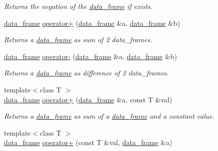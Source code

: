 \begin{DoxyCompactItemize}
\begin{DoxyCompactList}\small\item\em Returns the negation of the \hyperlink{classboost_1_1numeric_1_1ublas_1_1data__frame}{data\+\_\+frame} if exists. \end{DoxyCompactList}\item 
\hyperlink{classboost_1_1numeric_1_1ublas_1_1data__frame}{data\+\_\+frame} \hyperlink{namespaceboost_1_1numeric_1_1ublas_aef3513791390396555e7784ec06119b1}{operator+} (\hyperlink{classboost_1_1numeric_1_1ublas_1_1data__frame}{data\+\_\+frame} \&a, \hyperlink{classboost_1_1numeric_1_1ublas_1_1data__frame}{data\+\_\+frame} \&b)
\begin{DoxyCompactList}\small\item\em Returns a \hyperlink{classboost_1_1numeric_1_1ublas_1_1data__frame}{data\+\_\+frame} as sum of 2 data\+\_\+frames. \end{DoxyCompactList}\item 
\hyperlink{classboost_1_1numeric_1_1ublas_1_1data__frame}{data\+\_\+frame} \hyperlink{namespaceboost_1_1numeric_1_1ublas_a7e69814ab82677f37fd012980ef7540f}{operator-\/} (\hyperlink{classboost_1_1numeric_1_1ublas_1_1data__frame}{data\+\_\+frame} \&a, \hyperlink{classboost_1_1numeric_1_1ublas_1_1data__frame}{data\+\_\+frame} \&b)
\begin{DoxyCompactList}\small\item\em Returns a \hyperlink{classboost_1_1numeric_1_1ublas_1_1data__frame}{data\+\_\+frame} as difference of 2 data\+\_\+frames. \end{DoxyCompactList}\item 
{\footnotesize template$<$class T $>$ }\\\hyperlink{classboost_1_1numeric_1_1ublas_1_1data__frame}{data\+\_\+frame} \hyperlink{namespaceboost_1_1numeric_1_1ublas_ac21b1bd53035a317958d2f381f781b0a}{operator+} (\hyperlink{classboost_1_1numeric_1_1ublas_1_1data__frame}{data\+\_\+frame} \&a, const T \&val)
\begin{DoxyCompactList}\small\item\em Returns a \hyperlink{classboost_1_1numeric_1_1ublas_1_1data__frame}{data\+\_\+frame} as sum of a \hyperlink{classboost_1_1numeric_1_1ublas_1_1data__frame}{data\+\_\+frame} and a constant value. \end{DoxyCompactList}\item 
{\footnotesize template$<$class T $>$ }\\\hyperlink{classboost_1_1numeric_1_1ublas_1_1data__frame}{data\+\_\+frame} \hyperlink{namespaceboost_1_1numeric_1_1ublas_a6edb2db4e95c040b323d6431a853339d}{operator+} (const T \&val, \hyperlink{classboost_1_1numeric_1_1ublas_1_1data__frame}{data\+\_\+frame} \&a)

\end{DoxyCompactItemize}
